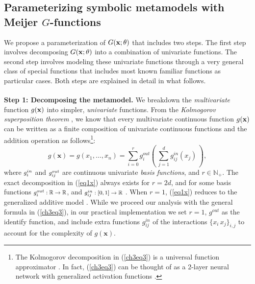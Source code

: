 \documentclass [PhD] {uclathes}
\begin{document}
\subsection{Parameterizing symbolic metamodels with Meijer $G$-functions}
\label{Sec31}
We propose a parameterization of $G({\bf x};\theta)$ that includes two steps. The first step involves decomposing $G({\bf x};\theta)$ into a combination of univariate functions. The second step involves modeling these univariate functions through a very general class of special functions that includes most known familiar functions as particular cases. Both steps are explained in detail in what follows. \\   
\\
{\bf Step 1: Decomposing the metamodel.} We breakdown the {\it multivariate} function $g({\bf x})$ into simpler, {\it univariate} functions. From the {\it Kolmogorov superposition theorem} \cite{kolmogorov1957representation}, we know that every multivariate continuous function $g({\bf x})$ can be written as a finite composition of univariate continuous functions and the addition operation as follows\footnote{The Kolmogorov decomposition in (\ref{ch3eq3}) is a universal function approximator \cite{hornik1989multilayer}. In fact, (\ref{ch3eq3}) can be thought of as a 2-layer neural network with generalized activation functions \cite{kuurkova1992kolmogorov, girosi1989representation, igelnik2003kolmogorov, hornik1989multilayer, cybenko1989approximation}.}:  
\begin{equation}
g(\mathbf{x}) = g(x_{1},\ldots,x_{n}) = \sum_{i=0}^{r}g^{out}_{i}\left(\,\sum_{j=1}^{d}g^{in}_{ij}(x_{j})\,\right),
\label{ch3eq3}
\end{equation}
where $\mbox{\footnotesize $g_i^{in}$}$ and $\mbox{\footnotesize $g_{ij}^{out}$}$ are continuous univariate {\it basis functions}, and $r \in \mathbb{N}_+$. The exact decomposition in (\ref{eq1x}) always exists for $r = 2d$, and for some basis functions $\mbox{\footnotesize $g_i^{out}: \mathbb{R} \to \mathbb{R}$}$, and $\mbox{\footnotesize $g_{ij}^{in}: [0,1] \to \mathbb{R}$}$ \cite{sprecher1993universal}. When $r=1$, (\ref{eq1x}) reduces to the generalized additive model \cite{hastie2017generalized}. While we proceed our analysis with the general formula in (\ref{ch3eq3}), in our practical implementation we set $r=1$, $g^{out}$ as the identify function, and include extra functions $g^{in}_{ij}$ of the interactions $\{x_i\,x_j\}_{i,j}$ to account for the complexity of $g(\mathbf{x})$. 
\end{document}
